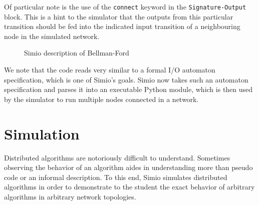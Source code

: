 \documentclass{scrartcl}
\def \kw#1{\texttt{\color{MidnightBlue}#1}}
\def \self {\texttt{\color{Cerulean}self}}
\def \py#1{\texttt{\color{LimeGreen}#1}}
\def \pyval#1{\texttt{\color{Sepia}#1}}
\begin{document}
Of particular note is the use of the \kw{connect} keyword in the
\kw{Signature-Output} block. This is a hint to the simulator that the outputs
from this particular transition should be fed into the indicated input
transition of a neighbouring node in the simulated network.

\begin{figure}\label{alg:1}
\caption{Simio description of Bellman-Ford}
\end{figure}

We note that the code reads very similar to a formal I/O automaton
specification, which is one of Simio's goals. Simio now takes such an automaton
specification and parses it into an executable Python module, which is then
used by the simulator to run multiple nodes connected in a network.

\section{Simulation}

Distributed algorithms are notoriously difficult to understand.
Sometimes observing the behavior of an algorithm aides in understanding more
than pseudo code or an informal description.
To this end, Simio simulates distributed algorithms in order to demonstrate to
the student the exact behavior of arbitrary algorithms in arbitrary network
topologies.
\end{document}
